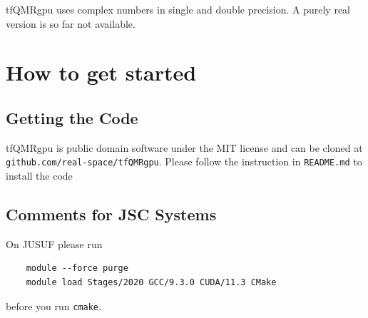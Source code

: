 \documentclass[oribibl]{llncs}
\newcommand{\ttt}[1]{\texttt{#1}}
\newcommand{\codename}{tfQMRgpu}
\begin{document}

\noindent
\codename{} uses complex numbers in single and double precision. A purely real version is so far not available.

\section{How to get started} \label{sec:how-to-get-started}
%
\subsection{Getting the Code} \label{sec:getting-the-code}
\codename{} is public domain software under the MIT license
and can be cloned at \ttt{github.com/real-space/tfQMRgpu}.
Please follow the instruction in \ttt{README.md} to install the code

\subsection{Comments for JSC Systems}
On JUSUF please run
\begin{verbatim}
	module --force purge
	module load Stages/2020 GCC/9.3.0 CUDA/11.3 CMake
\end{verbatim}
before you run \ttt{cmake}.
\end{document}
